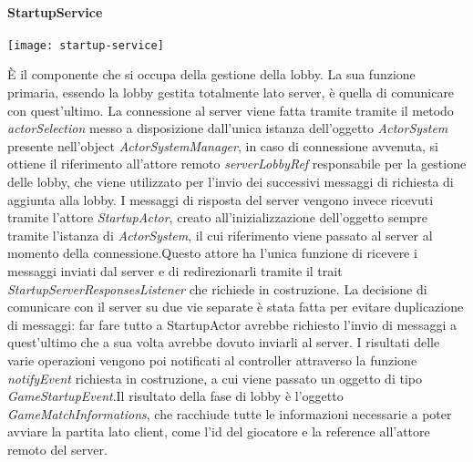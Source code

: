 \paragraph{StartupService}
\begin{center}
    \texttt{[image: startup-service]}
\end{center}
È il componente che si occupa della gestione della lobby.
La sua funzione primaria, essendo la lobby gestita totalmente lato server, è quella di comunicare con quest’ultimo. \newline La connessione al server viene fatta tramite tramite il metodo \textit{actorSelection} messo a disposizione dall’unica istanza dell’oggetto \textit{ActorSystem} presente nell’object \textit{ActorSystemManager}, in caso di connessione avvenuta, si ottiene il riferimento all’attore remoto \textit{serverLobbyRef} responsabile per la gestione delle lobby, che viene utilizzato per l’invio dei successivi messaggi di richiesta di aggiunta alla lobby. \newline
I messaggi di risposta del server vengono invece ricevuti tramite l’attore \textit{StartupActor}, creato all’inizializzazione dell’oggetto sempre tramite l’istanza di \textit{ActorSystem}, il cui riferimento viene passato al server al momento della connessione.\newline Questo attore ha l’unica funzione di ricevere i messaggi inviati dal server e di redirezionarli tramite il trait \textit{StartupServerResponsesListener} che richiede in costruzione.\newline
La decisione di comunicare con il server su due vie separate è stata fatta per evitare duplicazione di messaggi: far fare tutto a StartupActor avrebbe richiesto l’invio di messaggi a quest’ultimo che a sua volta avrebbe dovuto inviarli al server.
I risultati delle varie operazioni vengono poi notificati al controller attraverso la funzione \textit{notifyEvent} richiesta in costruzione, a cui viene passato un oggetto di tipo \textit{GameStartupEvent}.\newline Il risultato della fase di lobby è l’oggetto \textit{GameMatchInformations}, che racchiude tutte le informazioni necessarie a poter avviare la partita lato client, come l'id del giocatore e la reference all'attore remoto del server.
\newpage
